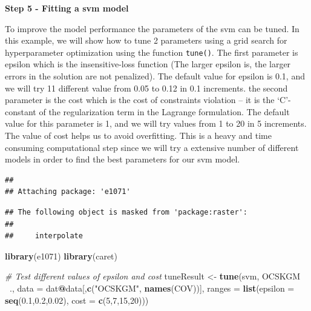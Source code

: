 \documentclass[10pt,b5paper,]{book}
\newenvironment{Shaded}{\begin{snugshade}}{\end{snugshade}}
\newcommand{\CommentTok}[1]{\textcolor[rgb]{0.56,0.35,0.01}{\textit{#1}}}
\newcommand{\DataTypeTok}[1]{\textcolor[rgb]{0.13,0.29,0.53}{#1}}
\newcommand{\DecValTok}[1]{\textcolor[rgb]{0.00,0.00,0.81}{#1}}
\newcommand{\FloatTok}[1]{\textcolor[rgb]{0.00,0.00,0.81}{#1}}
\newcommand{\KeywordTok}[1]{\textcolor[rgb]{0.13,0.29,0.53}{\textbf{#1}}}
\newcommand{\NormalTok}[1]{#1}
\newcommand{\OperatorTok}[1]{\textcolor[rgb]{0.81,0.36,0.00}{\textbf{#1}}}
\newcommand{\StringTok}[1]{\textcolor[rgb]{0.31,0.60,0.02}{#1}}
\theoremstyle{definition}
\theoremstyle{definition}
\theoremstyle{definition}
\theoremstyle{remark}
\begin{document}
\textbf{Step 5 - Fitting a svm model}

To improve the model performance the parameters of the svm can be tuned.
In this example, we will show how to tune 2 parameters using a grid
search for hyperparameter optimization using the function
\texttt{tune()}. The first parameter is epsilon which is the
insensitive-loss function (The larger epsilon is, the larger errors in
the solution are not penalized). The default value for epsilon is 0.1,
and we will try 11 different value from 0.05 to 0.12 in 0.1 increments.
the second parameter is the cost which is the cost of constraints
violation -- it is the `C'-constant of the regularization term in the
Lagrange formulation. The default value for this parameter is 1, and we
will try values from 1 to 20 in 5 increments. The value of cost helps us
to avoid overfitting. This is a heavy and time consuming computational
step since we will try a extensive number of different models in order
to find the best parameters for our svm model.

\begin{verbatim}
## 
## Attaching package: 'e1071'
\end{verbatim}

\begin{verbatim}
## The following object is masked from 'package:raster':
## 
##     interpolate
\end{verbatim}

\begin{Shaded}
\begin{Highlighting}[]
\KeywordTok{library}\NormalTok{(e1071)}
\KeywordTok{library}\NormalTok{(caret)}

\CommentTok{# Test different values of epsilon and cost}
\NormalTok{  tuneResult <-}\StringTok{ }\KeywordTok{tune}\NormalTok{(svm, OCSKGM }\OperatorTok{~}\NormalTok{.,  }\DataTypeTok{data =}\NormalTok{ dat}\OperatorTok{@}\NormalTok{data[,}\KeywordTok{c}\NormalTok{(}\StringTok{"OCSKGM"}\NormalTok{,}
                                                         \KeywordTok{names}\NormalTok{(COV))],}
                     \DataTypeTok{ranges =} \KeywordTok{list}\NormalTok{(}\DataTypeTok{epsilon =} \KeywordTok{seq}\NormalTok{(}\FloatTok{0.1}\NormalTok{,}\FloatTok{0.2}\NormalTok{,}\FloatTok{0.02}\NormalTok{),}
                                   \DataTypeTok{cost =} \KeywordTok{c}\NormalTok{(}\DecValTok{5}\NormalTok{,}\DecValTok{7}\NormalTok{,}\DecValTok{15}\NormalTok{,}\DecValTok{20}\NormalTok{)))}
\end{Highlighting}
\end{Shaded}
\end{document}
